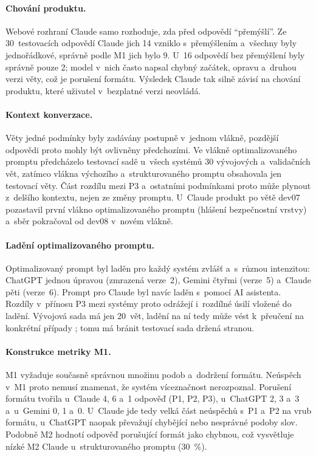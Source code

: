 \documentclass[11pt,a4paper]{article}
\begin{document}
\paragraph{Chování produktu.}
Webové rozhraní Claude samo rozhoduje, zda před odpovědí
\enquote{přemýšlí}. Ze 30~testovacích odpovědí Claude jich 14 vzniklo
s~přemýšlením a~všechny byly jednořádkové, správně podle M1 jich bylo
9. U~16 odpovědí bez přemýšlení byly správně pouze 2; model v~nich
často napsal chybný začátek, opravu a~druhou verzi věty, což je
porušení formátu. Výsledek Claude tak silně závisí na chování
produktu, které uživatel v~bezplatné verzi neovládá.

\paragraph{Kontext konverzace.}
Věty jedné podmínky byly zadávány postupně v~jednom vlákně, pozdější
odpovědi proto mohly být ovlivněny předchozími. Ve vlákně
optimalizovaného promptu předcházelo testovací sadě u~všech systémů
30 vývojových a~validačních vět, zatímco vlákna výchozího
a~strukturovaného promptu obsahovala jen testovací věty. Část rozdílu
mezi P3 a~ostatními podmínkami proto může plynout z~delšího kontextu,
nejen ze změny promptu. U~Claude produkt po větě dev07 pozastavil
první vlákno optimalizovaného promptu (hlášení bezpečnostní vrstvy)
a~sběr pokračoval od dev08 v~novém vlákně.

\paragraph{Ladění optimalizovaného promptu.}
Optimalizovaný prompt byl laděn pro každý systém zvlášť a~s~různou
intenzitou: ChatGPT jednou úpravou (zmrazená verze~2), Gemini čtyřmi
(verze~5) a~Claude pěti (verze~6). Prompt pro Claude byl navíc laděn
s~pomocí AI asistenta. Rozdíly v~přínosu P3 mezi systémy proto
odrážejí i~rozdílné úsilí vložené do ladění. Vývojová sada má jen
20~vět, ladění na ní tedy může vést k~přeučení na konkrétní případy
\cite{perez2021}; tomu má bránit testovací sada držená stranou.

\paragraph{Konstrukce metriky M1.}
M1 vyžaduje současně správnou množinu podob a~dodržení formátu. Neúspěch
v~M1 proto nemusí znamenat, že systém víceznačnost nerozpoznal.
Porušení formátu tvořila u~Claude 4, 6 a~1 odpověď (P1, P2, P3), u~ChatGPT
2, 3 a~3 a~u~Gemini 0, 1 a~0. U~Claude jde tedy velká část neúspěchů
s~P1 a~P2 na vrub formátu, u~ChatGPT naopak převažují chybějící nebo
nesprávné podoby slov. Podobně M2 hodnotí odpověď porušující formát
jako chybnou, což vysvětluje nízké M2 Claude u~strukturovaného promptu
(30~\%).
\end{document}
